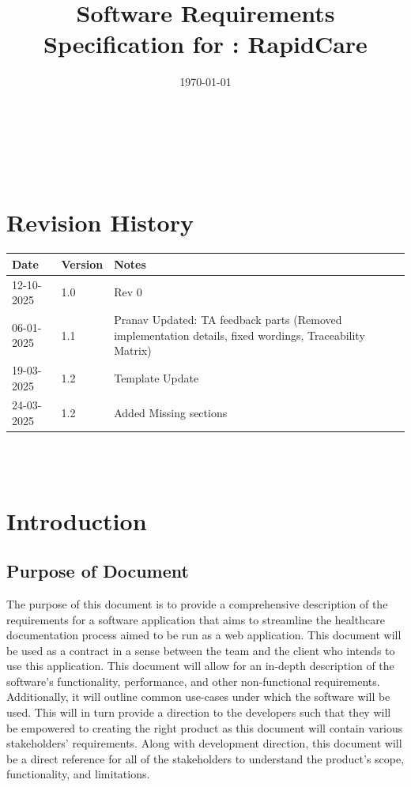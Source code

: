 \documentclass[12pt]{article}
\begin{document}
\title{Software Requirements Specification for \progname: RapidCare} 
\author{\authname}
\date{\today}
	
\maketitle

~\newpage


\tableofcontents

~\newpage

\section*{Revision History}

\begin{tabularx}{\textwidth}{p{3cm}p{2cm}X}
\toprule {\textbf{Date}} & {\textbf{Version}} & {\textbf{Notes}}\\
\midrule
12-10-2025 & 1.0 & Rev 0\\
06-01-2025 & 1.1 & Pranav Updated: TA feedback parts (Removed implementation details, fixed wordings, Traceability Matrix)\\
19-03-2025 & 1.2 & Template Update \\
24-03-2025 &1.2 & Added Missing sections \\

\bottomrule
\end{tabularx}

~\\

~\newpage

\section{Introduction}

\subsection{Purpose of Document} \label{sec_PurposeOfDocument}
The purpose of this document is to provide a comprehensive description of the requirements for a software application that aims to streamline the healthcare documentation process aimed to be run as a web application. This document will be used as a contract in a sense between the team and the client who intends to use this application. This document will allow for an in-depth description of the software's functionality, performance, and other non-functional requirements. Additionally, it will outline common use-cases under which the software will be used. This will in turn provide a direction to the developers such that they will be empowered to creating the right product as this document will contain various stakeholders' requirements. Along with development direction, this document will be a direct reference for all of the stakeholders to understand the product's scope, functionality, and limitations.
\end{document}
